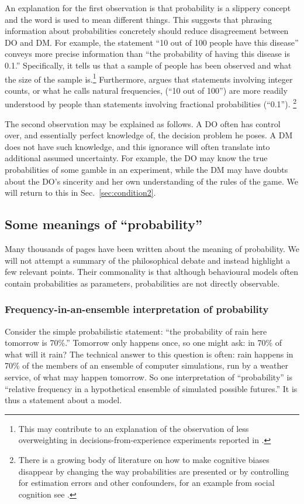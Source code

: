 \documentclass[12pt,letter,timesnewroman]{article}
\newcommand{\seclabel}[1]{\label{sec:#1}}
\newcommand{\secref}[1]{Sec.~\ref{sec:#1}}
\begin{document}
An explanation for the first observation is that probability is a slippery concept and the word is used to mean different things. This suggests that phrasing information about probabilities concretely should reduce disagreement between DO and DM. For example, the statement ``10 out of 100 people have this disease'' conveys more precise information than ``the probability of having this disease is 0.1.'' Specifically, it tells us that a sample of people has been observed and what the size of the sample is.\footnote{This may contribute to an explanation of the observation of less overweighting in decisions-from-experience experiments reported in \textcite{HertwigETAL2004,HertwigErev2009}.} Furthermore, \textcite{Gigerenzer2018} argues that statements involving integer counts, or what he calls natural frequencies,  (``10 out of 100'') are more readily understood by people than statements involving fractional probabilities (``0.1'').%
\footnote{There is a growing body of literature on how to make cognitive biases disappear by changing the way probabilities are presented \parencite{Gigerenzer1991} or by controlling for estimation errors and other confounders, for an example from social cognition see \textcite{GalesicETAL2012}.}

The second observation may be explained as follows. A DO often has control over, and essentially perfect knowledge of, the decision problem he poses. A DM does not have such knowledge, and this ignorance will often translate into additional assumed uncertainty. For example, the DO may know the true probabilities of some gamble in an experiment, while the DM may have doubts about the DO's sincerity and her own understanding of the rules of the game. We will return to this in \secref{condition2}.

\subsection{Some meanings of ``probability'' \seclabel{tricky}}
Many thousands of pages have been written about the meaning of probability. We will not attempt a summary of the philosophical debate and instead highlight a few relevant points. Their commonality is that although behavioural models often contain probabilities as parameters, probabilities are not directly observable.

\subsubsection*{Frequency-in-an-ensemble interpretation of probability}
Consider the simple probabilistic statement: ``the probability of rain here tomorrow is 70\%.'' Tomorrow only happens once, so one might ask: in 70\% of what will it rain? The technical answer to this question is often: rain happens in 70\% of the members of an ensemble of computer simulations, run by a weather service, of what may happen tomorrow. So one interpretation of ``probability'' is ``relative frequency in a hypothetical ensemble of simulated possible futures.'' It is thus a statement about a model.
\end{document}
